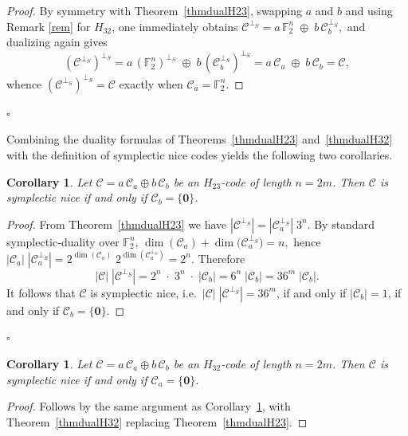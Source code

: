 \documentclass[11pt,a4paper]{article}
\def\qed{\hfill {$\square$}\goodbreak \medskip}
\newtheorem{corollary}[theorem]{Corollary}
\theoremstyle{definition}
\numberwithin{equation}{section}
\newcommand{\F}{\mathbb{F}}
\def\C{{\mathcal{C}}}
\begin{document}
\begin{proof}
By symmetry with Theorem~\ref{thmdualH23}, swapping  \(a\) and \(b\) and using Remark \ref{rem}
for \(H_{32}\), one immediately obtains $\C^{\perp_S}
= a\,\F_2^n \;\oplus\; b\,\C_b^{\perp_S},$
and dualizing again gives
\[
(\C^{\perp_S})^{\perp_S}
= a\,(\F_2^n)^{\perp_S}\;\oplus\; b\,(\C_b^{\perp_S})^{\perp_S}
= a\,\C_a\;\oplus\; b\,\C_b=\C,
\]
whence \((\C^{\perp_S})^{\perp_S}=\C\) exactly when \(\C_a=\F_2^n\).
\end{proof}

\qed


\medskip

\noindent  Combining the duality formulas of Theorems~\ref{thmdualH23} and~\ref{thmdualH32} with the definition of symplectic nice codes yields the following two corollaries.

\begin{corollary}\label{nice1} 
Let $\C=a\, \C_a \oplus b\, \C_b$ be an $H_{23}$-code of length $n=2m$. 
Then $\C$ is symplectic nice if and only if $\C_b=\{\mathbf{0}\}$.


\end{corollary}

\begin{proof}
From Theorem~\ref{thmdualH23} we have $|\C^{\perp_S}|=|\C_a^{\perp_S}|\;3^n.$
By standard symplectic‐duality over \(\F_2^n\), $\dim(\C_a) + \dim\bigl(\C_a^{\perp_S}\bigr) = n,$
hence $|\C_a|\;|\C_a^{\perp_S}|
=2^{\dim(\C_a)}\;2^{\dim(\C_a^{\perp_S})}
=2^n.$
Therefore
\[
|\C|\;|\C^{\perp_S}|
=2^n\;\cdot\;3^n\;\cdot\;|\C_b|
=6^n\;|\C_b|
=36^m\;|\C_b|.
\]
It follows that \(\C\) is symplectic nice, i.e.\ \(|\C|\;|\C^{\perp_S}|=36^m\), if and only if \(|\C_b|=1\), if and only if \(\C_b=\{\mathbf0\}\).
\end{proof}

\qed

\begin{corollary}\label{nice2} 
Let $\C=a\, \C_a \oplus b\, \C_b$ be an $H_{32}$-code of length $n=2m$. 
Then $\C$ is symplectic nice if and only if $\C_a=\{\mathbf{0}\}$.


\end{corollary}
\begin{proof}
Follows by the same argument as Corollary~\ref{nice1}, with Theorem~\ref{thmdualH32} replacing Theorem~\ref{thmdualH23}.
\end{proof}
\end{document}
